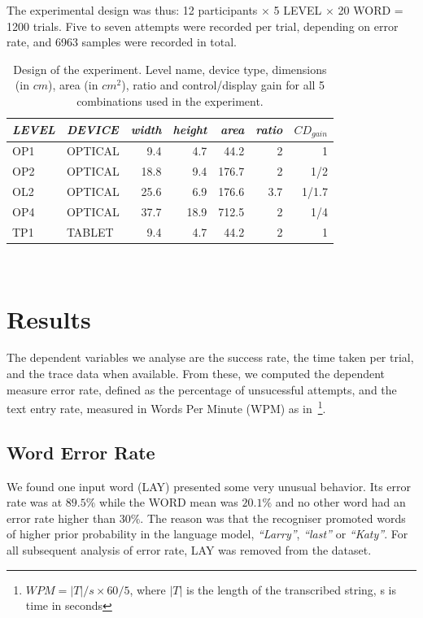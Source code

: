 \documentclass{chi-ext}
\newcommand{\smit}[1]{{\small\textit{{#1}}}}
\newcommand{\cdt}[1]{{\small\uppercase{{#1}}}}
\begin{document}
The experimental design was thus: 12 participants $\times$ 5 \cdt{level} $\times$ 20 \cdt{word} = 1200 trials. Five to seven attempts were recorded per trial, depending on error rate, and 6963 samples were recorded in total.

\begin{table}
  \centering
  \begin{tabular}{l l | r r r r r}
    \smit{LEVEL} & \smit{DEVICE} & \smit{width} & \smit{height} & \smit{area}& \smit{ratio} & \smit{$CD_{gain}$} \\
    \hline
    \cdt{OP1} & \cdt{optical} & 9.4 & 4.7 & 44.2 & 2 & 1 \\
    \cdt{OP2} & \cdt{optical} & 18.8 & 9.4 & 176.7 & 2 & 1/2 \\
    \cdt{OL2} & \cdt{optical} & 25.6 & 6.9 & 176.6 & 3.7 & 1/1.7 \\
    \cdt{OP4} & \cdt{optical} & 37.7 & 18.9 & 712.5 & 2 & 1/4 \\
    \hline
    \cdt{tp1} & \cdt{tablet} & 9.4 & 4.7 & 44.2 & 2 & 1 \\
  \end{tabular}
  \caption{Design of the experiment. Level name, device type, dimensions (in $cm$), area (in $cm^2$), ratio and control/display gain for all 5 combinations used in the experiment.}~\label{tab:cdt}
\end{table}

\section{Results}
The dependent variables we analyse are the success rate, the time taken per trial, and the trace data when available. From these, we computed the dependent measure error rate, defined as the percentage of unsucessful attempts, and the text entry rate, measured in Words Per Minute (WPM) as in~\cite{Markussen2014}\footnote{$WPM = |T|/s \times 60/5$, where $|T|$ is the length of the transcribed string, s is time in seconds}.

\subsection{Word Error Rate}
We found one input word (\cdt{lay}) presented some very unusual behavior. Its error rate was at $89.5\%$ while the \cdt{WORD} mean was $20.1\%$ and no other word had an error rate higher than $30\%$. The reason was that the recogniser promoted words of higher prior probability in the language model, \textit{``Larry''}, \textit{``last''} or \textit{``Katy''}. For all subsequent analysis of error rate, \cdt{lay} was removed from the dataset.
\end{document}
